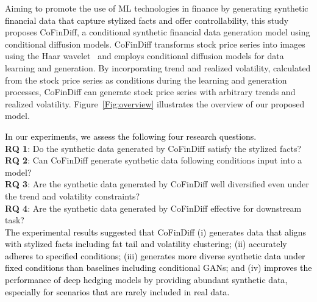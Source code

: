\documentclass{article}
\newcommand{\takehiro}[1]{\textcolor{black}{#1}}
\newcommand{\hashimoto}[1]{\textcolor{black}{#1}}
\begin{document}
Aiming to promote the use of ML technologies in finance by generating synthetic \takehiro{financial data that capture stylized facts and offer controllability}, this study proposes CoFinDiff, a conditional synthetic financial data generation model using conditional diffusion models. CoFinDiff transforms stock price series into images using the Haar wavelet~\cite{wavelet} and employs conditional diffusion models for data learning and generation. By incorporating trend and realized volatility, calculated from the stock price series as conditions during the learning and generation processes, CoFinDiff can generate stock price series with arbitrary trends and realized volatility. Figure~\ref{Fig:overview} illustrates the overview of our proposed model.

\hashimoto{In our experiments, we assess the following four research questions.}\\ \indent
\textbf{RQ 1}: Do the synthetic data generated by CoFinDiff satisfy the stylized facts? \\ \indent
\textbf{RQ 2}: Can CoFinDiff generate synthetic data following conditions input into a model? \\ \indent
\textbf{RQ 3}: Are the synthetic data generated by CoFinDiff well diversified even under the trend and volatility constraints? \\ \indent
\textbf{RQ 4}: Are the synthetic data generated by CoFinDiff effective for downstream task?\\
\hashimoto{The experimental results suggested that CoFinDiff (i) generates data that aligns with stylized facts including fat tail and volatility clustering; (ii) accurately adheres to specified conditions; (iii) \takehiro{generates} more diverse synthetic data under fixed conditions than baselines including 
\takehiro{conditional} GANs; and (iv) improves the performance of deep hedging models by providing abundant synthetic data, especially for scenarios that are rarely included in real data.}



\end{document}
